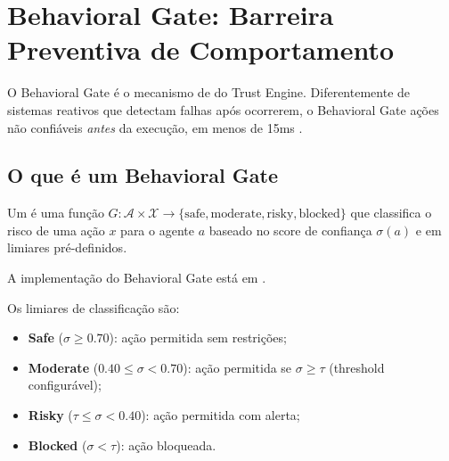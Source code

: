 \section{Behavioral Gate: Barreira Preventiva de Comportamento}
\label{sec:behavioral-gate}
\nivelavancado

O Behavioral Gate é o mecanismo de  do
Trust Engine. Diferentemente de sistemas reativos que detectam falhas
após ocorrerem, o Behavioral Gate  ações não
confiáveis \emph{antes} da execução, em menos de 15ms \cite{opencode2026spec038}.

\subsection{O que é um Behavioral Gate}

\begin{definicao}
Um  é uma função $G: \mathcal{A} \times
\mathcal{X} \to \{\text{safe}, \text{moderate}, \text{risky},
\text{blocked}\}$ que classifica o risco de uma ação $x$ para o
agente $a$ baseado no score de confiança $\sigma(a)$ e em limiares
pré-definidos.
\end{definicao}

A implementação do Behavioral Gate está em
.

Os limiares de classificação são:
\begin{itemize}
\item \textbf{Safe} ($\sigma \geq 0.70$): ação permitida sem
restrições;
\item \textbf{Moderate} ($0.40 \leq \sigma < 0.70$): ação permitida
se $\sigma \geq \tau$ (threshold configurável);
\item \textbf{Risky} ($\tau \leq \sigma < 0.40$): ação permitida com
alerta;
\item \textbf{Blocked} ($\sigma < \tau$): ação bloqueada.
\end{itemize}

